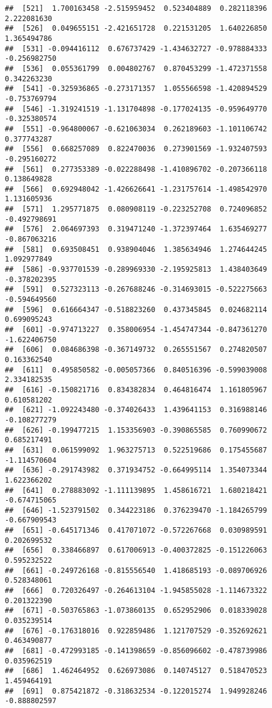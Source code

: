 \documentclass[
]{article}
\begin{document}
\begin{verbatim}
##  [521]  1.700163458 -2.515959452  0.523404889  0.282118396  2.222081630
##  [526]  0.049655151 -2.421651728  0.221531205  1.640226850  1.365494786
##  [531] -0.094416112  0.676737429 -1.434632727 -0.978884333 -0.256982750
##  [536]  0.055361799  0.004802767  0.870453299 -1.472371558  0.342263230
##  [541] -0.325936865 -0.273171357  1.055566598 -1.420894529 -0.753769794
##  [546] -1.319241519 -1.131704898 -0.177024135 -0.959649770 -0.325380574
##  [551] -0.964800067 -0.621063034  0.262189603 -1.101106742  0.377743287
##  [556]  0.668257089  0.822470036  0.273901569 -1.932407593 -0.295160272
##  [561]  0.277353389 -0.022288498 -1.410896702 -0.207366118  0.138649828
##  [566]  0.692948042 -1.426626641 -1.231757614 -1.498542970  1.131605936
##  [571]  1.295771875  0.080908119 -0.223252708  0.724096852 -0.492798691
##  [576]  2.064697393  0.319471240 -1.372397464  1.635469277 -0.867063216
##  [581]  0.693508451  0.938904046  1.385634946  1.274644245  1.092977849
##  [586] -0.937701539 -0.289969330 -2.195925813  1.438403649 -0.378202395
##  [591]  0.527323113 -0.267688246 -0.314693015 -0.522275663 -0.594649560
##  [596]  0.616664347 -0.518823260  0.437345845  0.024682114  0.699095243
##  [601] -0.974713227  0.358006954 -1.454747344 -0.847361270 -1.622406750
##  [606]  0.084686398 -0.367149732  0.265551567  0.274820507  0.163362540
##  [611]  0.495850582 -0.005057366  0.840516396 -0.599039008  2.334182535
##  [616] -0.150821716  0.834382834  0.464816474  1.161805967  0.610581202
##  [621] -1.092243480 -0.374026433  1.439641153  0.316988146 -0.108277279
##  [626] -0.199477215  1.153356903 -0.390865585  0.760990672  0.685217491
##  [631]  0.061599092  1.963275713  0.522519686  0.175455687 -1.114570604
##  [636] -0.291743982  0.371934752 -0.664995114  1.354073344  1.622366202
##  [641]  0.278883092 -1.111139895  1.458616721  1.680218421 -0.674715065
##  [646] -1.523791502  0.344223186  0.376239470 -1.184265799 -0.667909543
##  [651] -0.645171346  0.417071072 -0.572267668  0.030989591  0.202699532
##  [656]  0.338466897  0.617006913 -0.400372825 -0.151226063  0.595232522
##  [661] -0.249726168 -0.815556540  1.418685193 -0.089706926  0.528348061
##  [666]  0.720326497 -0.264613104 -1.945855028 -1.114673322  0.201322390
##  [671] -0.503765863 -1.073860135  0.652952906  0.018339028  0.035239514
##  [676] -0.176318016  0.922859486  1.121707529 -0.352692621  0.463490877
##  [681] -0.472993185 -0.141398659 -0.856096602 -0.478739986  0.035962519
##  [686]  1.462464952  0.626973086  0.140745127  0.518470523  1.459464191
##  [691]  0.875421872 -0.318632534 -0.122015274  1.949928246 -0.888802597

\end{verbatim}
\end{document}

